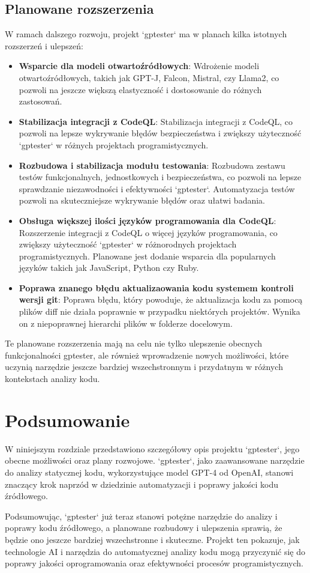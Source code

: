 \subsection{Planowane rozszerzenia}
\label{subsec:planowane_rozszerzenia}

W ramach dalszego rozwoju, projekt `gptester` ma w planach kilka istotnych rozszerzeń i ulepszeń:

\begin{itemize}
    \item \textbf{Wsparcie dla modeli otwartoźródłowych}: Wdrożenie modeli otwartoźródłowych, takich jak GPT-J, Falcon, Mistral, czy Llama2, co pozwoli na jeszcze większą elastyczność i dostosowanie do różnych zastosowań.
    \item \textbf{Stabilizacja integracji z CodeQL}: Stabilizacja integracji z CodeQL, co pozwoli na lepsze wykrywanie błędów bezpieczeństwa i zwiększy użyteczność `gptester` w różnych projektach programistycznych.
    \item \textbf{Rozbudowa i stabilizacja modułu testowania}: Rozbudowa zestawu testów funkcjonalnych, jednostkowych i bezpieczeństwa, co pozwoli na lepsze sprawdzanie niezawodności i efektywności `gptester`. Automatyzacja testów pozwoli na skuteczniejsze wykrywanie błędów oraz ułatwi badania.
    \item \textbf{Obsługa większej ilości języków programowania dla CodeQL}: Rozszerzenie integracji z CodeQL o więcej języków programowania, co zwiększy użyteczność `gptester` w różnorodnych projektach programistycznych. Planowane jest dodanie wsparcia dla popularnych języków takich jak JavaScript, Python czy Ruby.
    \item \textbf{Poprawa znanego błędu aktualizaowania kodu systemem kontroli wersji git}: Poprawa błędu, który powoduje, że aktualizacja kodu za pomocą plików diff nie działa poprawnie w przypadku niektórych projektów. Wynika on z niepoprawnej hierarchi plików w folderze docelowym.
\end{itemize}

Te planowane rozszerzenia mają na celu nie tylko ulepszenie obecnych funkcjonalności gptester, ale również wprowadzenie nowych możliwości, które uczynią narzędzie jeszcze bardziej wszechstronnym i przydatnym w różnych kontekstach analizy kodu.
\section{Podsumowanie}
\label{sec:podsumowanie}

W niniejszym rozdziale przedstawiono szczegółowy opis projektu `gptester`, jego obecne możliwości oraz plany rozwojowe. `gptester`, jako zaawansowane narzędzie do analizy statycznej kodu, wykorzystujące model GPT-4 od OpenAI, stanowi znaczący krok naprzód w dziedzinie automatyzacji i poprawy jakości kodu źródłowego.


Podsumowując, `gptester` już teraz stanowi potężne narzędzie do analizy i poprawy kodu źródłowego, a planowane rozbudowy i ulepszenia sprawią, że będzie ono jeszcze bardziej wszechstronne i skuteczne. Projekt ten pokazuje, jak technologie AI i narzędzia do automatycznej analizy kodu mogą przyczynić się do poprawy jakości oprogramowania oraz efektywności procesów programistycznych.
